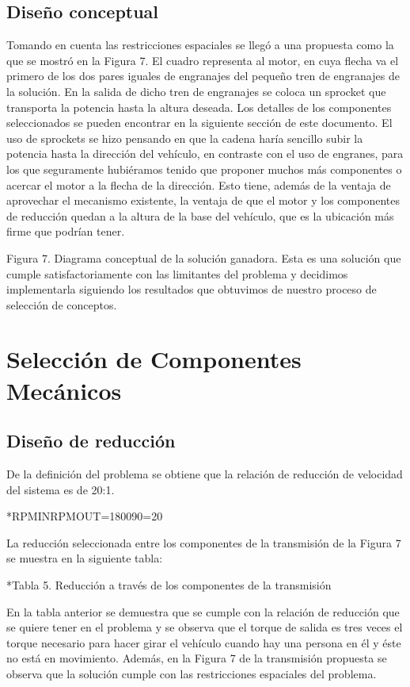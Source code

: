 \subsection{Diseño conceptual}

Tomando en cuenta las restricciones espaciales se llegó a una propuesta como la que se mostró en la Figura 7. El cuadro representa al motor, en cuya flecha va el primero de los dos pares iguales de engranajes del pequeño tren de engranajes de la solución. En la salida de dicho tren de engranajes se coloca un sprocket que transporta la potencia hasta la altura deseada. Los detalles de los componentes seleccionados se pueden encontrar en la siguiente sección de este documento. El uso de sprockets se hizo pensando en que la cadena haría sencillo subir la potencia hasta la dirección del vehículo, en contraste con el uso de engranes, para los que seguramente hubiéramos tenido que proponer muchos más componentes o acercar el motor a la flecha de la dirección. Esto tiene, además de la ventaja de aprovechar el mecanismo existente, la ventaja de que el motor y los componentes de reducción quedan a la altura de la base del vehículo, que es la ubicación más firme que podrían tener. 

Figura 7. Diagrama conceptual de la solución ganadora.
Esta es una solución que cumple satisfactoriamente con las limitantes del problema y decidimos implementarla siguiendo los resultados que obtuvimos de nuestro proceso de selección de conceptos.
\section{Selección de Componentes Mecánicos}
\subsection{Diseño de reducción}
De la definición del problema se obtiene que la relación de reducción de velocidad del sistema es de 20:1.

*RPMINRPMOUT=180090=20

La reducción seleccionada entre los componentes de la transmisión de la Figura 7 se muestra en la siguiente tabla:

*Tabla 5. Reducción a través de los componentes de la transmisión

En la tabla anterior se demuestra que se cumple con la relación de reducción que se quiere tener en el problema y se observa que el torque de salida es tres veces el torque necesario para hacer girar el vehículo cuando hay una persona en él y éste no está en movimiento. Además, en la Figura 7 de la transmisión propuesta se observa que la solución cumple con las restricciones espaciales del problema.

